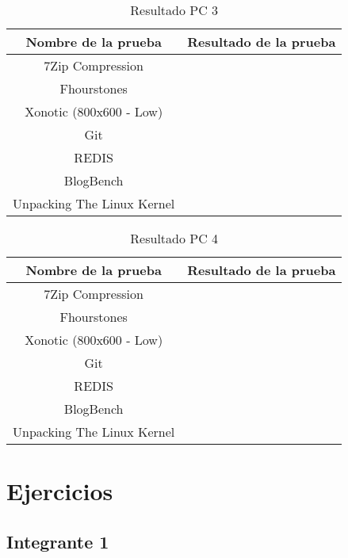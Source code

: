 \documentclass[12pt]{article}
\begin{document}
\begin{table}[!htb]
    \centering
    \begin{tabular}{|c|c|}
        \hline
        \textbf{Nombre de la prueba} & \textbf{Resultado de la prueba}\\
        \hline
        7Zip Compression &  \\
        \hline
        Fhourstones &  \\
        \hline
        Xonotic (800x600 - Low) &  \\
        \hline
        Git &  \\
        \hline
        REDIS &  \\
        \hline
        BlogBench &  \\
        \hline
        Unpacking The Linux Kernel &  \\
        \hline
    \end{tabular}
    \caption{Resultado PC 3}
\end{table}

\begin{table}[!htb]
    \centering
    \begin{tabular}{|c|c|}
        \hline
        \textbf{Nombre de la prueba} & \textbf{Resultado de la prueba}\\
        \hline
        7Zip Compression &  \\
        \hline
        Fhourstones &  \\
        \hline
        Xonotic (800x600 - Low) &  \\
        \hline
        Git &  \\
        \hline
        REDIS &  \\
        \hline
        BlogBench &  \\
        \hline
        Unpacking The Linux Kernel &  \\
        \hline
    \end{tabular}
    \caption{Resultado PC 4}
\end{table}

\newpage
\section{Ejercicios}
\subsection{Integrante 1}
\end{document}
